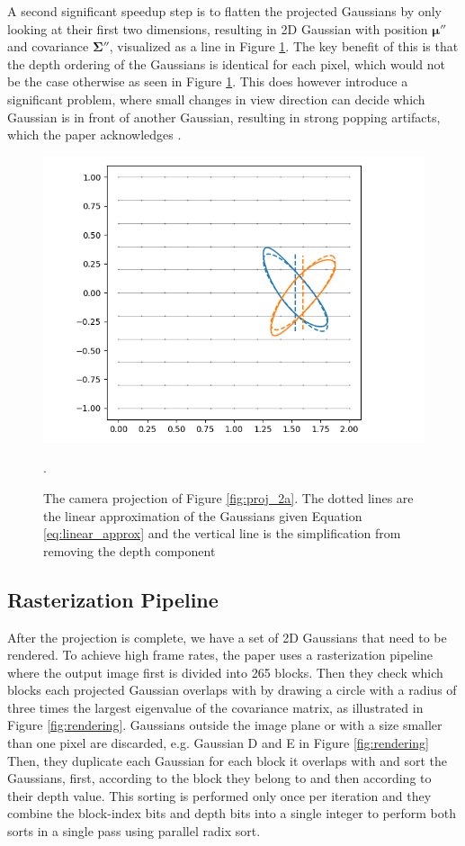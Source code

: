 A second significant speedup step is to flatten the projected Gaussians by only looking at their first two dimensions, resulting in 2D Gaussian with position $\bm{\mu}''$ and covariance $\bm{\Sigma}''$, visualized as a line in Figure \ref{fig:proj_2b}.
The key benefit of this is that the depth ordering of the Gaussians is identical for each pixel, which would not be the case otherwise as seen in Figure \ref{fig:proj_2b}.
This does however introduce a significant problem, where small changes in view direction can decide which Gaussian is in front of another Gaussian, resulting in strong popping artifacts, which the paper acknowledges \cite[Sec 7.4]{kerbl3DGaussianSplatting2023}.

\begin{figure}[htb]
    \centering
    \includegraphics[width=\linewidth]{images/projb.png}
    \caption{The camera projection of Figure \ref{fig:proj_2a}. The dotted lines are the linear approximation of the Gaussians given Equation \ref{eq:linear_approx} and the vertical line is the simplification from removing the depth component}.
    \label{fig:proj_2b}
\end{figure}


\subsection{Rasterization Pipeline}
\label{sec:rasterization}
After the projection is complete, we have a set of 2D Gaussians that need to be rendered.
To achieve high frame rates, the paper uses a rasterization pipeline where the output image first is divided into 265 blocks.
Then they check which blocks each projected Gaussian overlaps with by drawing a circle with a radius of three times the largest eigenvalue of the covariance matrix, as illustrated in Figure \ref{fig:rendering}.
Gaussians outside the image plane or with a size smaller than one pixel are discarded, e.g. Gaussian D and E in Figure \ref{fig:rendering}
Then, they duplicate each Gaussian for each block it overlaps with and sort the Gaussians, first, according to the block they belong to and then according to their depth value.
This sorting is performed only once per iteration and they combine the block-index bits and depth bits into a single integer to perform both sorts in a single pass using parallel radix sort.

